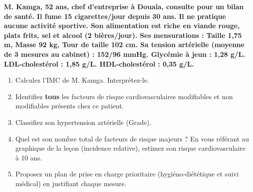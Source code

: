 \documentclass[11pt]{article}
\begin{document}
\begin{exercice}
\textbf{M. Kamga, 52 ans, chef d'entreprise à Douala, consulte pour un bilan de santé. Il fume 15 cigarettes/jour depuis 30 ans. Il ne pratique aucune activité sportive. Son alimentation est riche en viande rouge, plats frits, sel et alcool (2 bières/jour). Ses mensurations : Taille 1,75 m, Masse 92 kg, Tour de taille 102 cm. Sa tension artérielle (moyenne de 3 mesures au cabinet) : 152/96 mmHg. Glycémie à jeun : 1,28 g/L. LDL-cholestérol : 1,85 g/L. HDL-cholestérol : 0,35 g/L.}
\begin{enumerate}
    \item Calculez l'IMC de M. Kamga. Interprétez-le.
    \item Identifiez \textbf{tous} les facteurs de risque cardiovasculaires modifiables et non modifiables présents chez ce patient.
    \item Classifiez son hypertension artérielle (Grade).
    \item Quel est son nombre total de facteurs de risque majeurs ? En vous référant au graphique de la leçon (incidence relative), estimez son risque cardiovasculaire à 10 ans.
    \item Proposez un plan de prise en charge prioritaire (hygiéno-diététique et suivi médical) en justifiant chaque mesure.
\end{enumerate}
\end{exercice}
\end{document}
